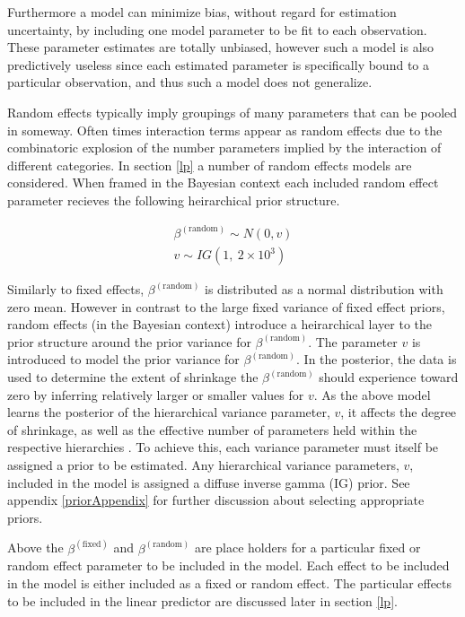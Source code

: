 \documentclass[12pt]{article}
\begin{document}
%
Furthermore a model can minimize bias, without regard for estimation 
uncertainty, by including one model parameter to be fit to each observation. 
These parameter estimates are totally unbiased, however such a model is also 
predictively useless since each estimated parameter is specifically bound to 
a particular observation, and thus such a model does not generalize. 

%
Random effects typically imply groupings of many parameters that can be 
pooled in someway. Often times interaction terms appear as random effects due 
to the combinatoric explosion of the number parameters implied by the 
interaction of different categories. In section \ref{lp} a number of random 
effects models are considered. When framed in the Bayesian context each 
included random effect parameter recieves the following heirarchical prior 
structure.  

%
\begin{align}
\beta^{(\text{random})} \sim N(0, v)\\
v \sim IG(1,~2\times10^{3})
\end{align}

%
Similarly to fixed effects, $\beta^{(\text{random})}$ is distributed as a 
normal distribution with zero mean. However in contrast to the large 
fixed variance of fixed effect priors, random effects (in the Bayesian 
context) introduce a heirarchical layer to the prior structure around the prior 
variance for $\beta^{(\text{random})}$. The parameter $v$ is 
introduced to model the prior variance for $\beta^{(\text{random})}$. In the 
posterior, the data is used to determine the extent of shrinkage the 
$\beta^{(\text{random})}$ should experience toward zero by inferring 
relatively larger or smaller values for $v$. As the above model learns the 
posterior of the hierarchical variance parameter, $v$, it affects 
the degree of shrinkage, as well as the effective number of parameters held 
within the respective hierarchies \cite{gelman_bayesian_2013}. To achieve this, each 
variance parameter must itself be assigned a prior to be estimated. Any 
hierarchical variance parameters, $v$, included in the model is 
assigned a {\color{red} diffuse inverse gamma (IG) prior. See appendix 
\ref{priorAppendix} for further discussion about selecting appropriate priors.}

%
Above the $\beta^{(\text{fixed})}$ and $\beta^{(\text{random})}$ are place 
holders for a particular fixed or random effect parameter to be included in the 
model. Each effect to be included in the model is either included as a fixed 
or random effect. The particular effects to be included in the linear 
predictor are discussed later in section \ref{lp}.
\end{document}
